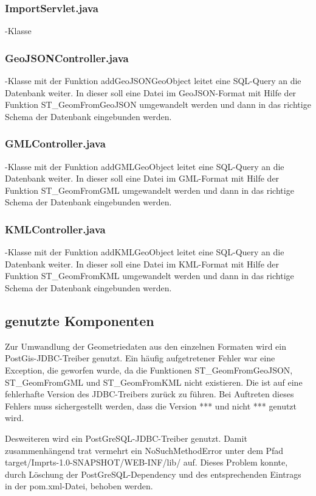 \documentclass[]{article}
\begin{document}
\subsubsection{ImportServlet.java}-Klasse
\subsubsection{GeoJSONController.java}-Klasse mit der Funktion addGeoJSONGeoObject leitet eine SQL-Query an die Datenbank weiter. In dieser soll eine Datei im GeoJSON-Format mit Hilfe der Funktion ST\_GeomFromGeoJSON umgewandelt werden und dann in das richtige Schema der Datenbank eingebunden werden.
\subsubsection{GMLController.java}-Klasse mit der Funktion addGMLGeoObject leitet eine SQL-Query an die Datenbank weiter. In dieser soll eine Datei im GML-Format mit Hilfe der Funktion ST\_GeomFromGML umgewandelt werden und dann in das richtige Schema der Datenbank eingebunden werden.
\subsubsection{KMLController.java}-Klasse mit der Funktion addKMLGeoObject leitet eine SQL-Query an die Datenbank weiter. In dieser soll eine Datei im KML-Format mit Hilfe der Funktion ST\_GeomFromKML umgewandelt werden und dann in das richtige Schema der Datenbank eingebunden werden.

\subsection{genutzte Komponenten}
Zur Umwandlung der Geometriedaten aus den einzelnen Formaten wird ein PostGis-JDBC-Treiber genutzt. Ein häufig aufgetretener Fehler war eine Exception, die geworfen wurde, da die Funktionen ST\_GeomFromGeoJSON, ST\_GeomFromGML und ST\_GeomFromKML nicht existieren. Die ist auf eine fehlerhafte Version des JDBC-Treibers zurück zu führen. Bei Auftreten dieses Fehlers muss sichergestellt werden, dass die Version *** und nicht *** genutzt wird.

Desweiteren wird ein PostGreSQL-JDBC-Treiber genutzt. Damit zusammenhängend trat vermehrt ein NoSuchMethodError unter dem Pfad target/Imprts-1.0-SNAPSHOT/WEB-INF/lib/ auf. Dieses Problem konnte, durch Löschung der PostGreSQL-Dependency und des entsprechenden Eintrags in der pom.xml-Datei, behoben werden.
\end{document}
